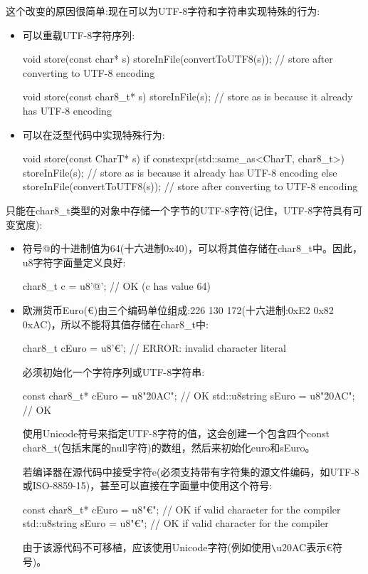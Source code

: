 这个改变的原因很简单:现在可以为UTF-8字符和字符串实现特殊的行为:

\begin{itemize}
\item
可以重载UTF-8字符序列:

\begin{cpp}
void store(const char* s)
{
	storeInFile(convertToUTF8(s)); // store after converting to UTF-8 encoding
}

void store(const char8_t* s)
{
	storeInFile(s); // store as is because it already has UTF-8 encoding
}
\end{cpp}

\item
可以在泛型代码中实现特殊行为:

\begin{cpp}
void store(const CharT* s)
{
	if constexpr(std::same_as<CharT, char8_t>) {
		storeInFile(s); // store as is because it already has UTF-8 encoding
	}
	else {
		storeInFile(convertToUTF8(s)); // store after converting to UTF-8 encoding
	}
}
\end{cpp}

\end{itemize}

只能在char8\_t类型的对象中存储一个字节的UTF-8字符(记住，UTF-8字符具有可变宽度):

\begin{itemize}
\item
符号@的十进制值为64(十六进制0x40)，可以将其值存储在char8\_t中。因此，u8字符字面量定义良好:

\begin{cpp}
char8_t c = u8'@'; // OK (c has value 64)
\end{cpp}

\item
欧洲货币Euro(€)由三个编码单位组成:226 130 172(十六进制:0xE2 0x82 0xAC)，所以不能将其值存储在char8\_t中:

\begin{cpp}
char8_t cEuro = u8'€'; // ERROR: invalid character literal
\end{cpp}

必须初始化一个字符序列或UTF-8字符串:

\begin{cpp}
const char8_t* cEuro = u8"\u20AC"; // OK
std::u8string sEuro = u8"\u20AC"; // OK
\end{cpp}

使用Unicode符号来指定UTF-8字符的值，这会创建一个包含四个const char8\_t(包括末尾的null字符)的数组，然后来初始化euro和sEuro。

若编译器在源代码中接受字符e(必须支持带有字符集的源文件编码，如UTF-8或ISO-8859-15)，甚至可以直接在字面量中使用这个符号:

\begin{cpp}
const char8_t* cEuro = u8"€"; // OK if valid character for the compiler
std::u8string sEuro = u8"€"; // OK if valid character for the compiler
\end{cpp}

由于该源代码不可移植，应该使用Unicode字符(例如使用\verb|\|u20AC表示€符号)。

\end{itemize}

